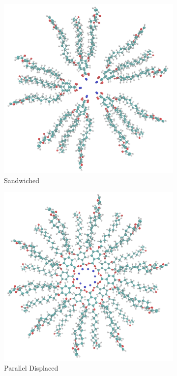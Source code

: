 \documentclass{article}
\begin{document}
\begin{figure}[h]
        \begin{subfigure}{0.475\textwidth}
                \centering
                \includegraphics[width=\textwidth]{sandwichedlayers.png}
                \caption{Sandwiched}\label{fig:sandwichedlayers}
        \end{subfigure}
        \begin{subfigure}{0.475\textwidth}
                \centering
                \includegraphics[width=\textwidth]{offsetlayers.png}
                \caption{Parallel Displaced}\label{fig:offsetlayers}
        \end{subfigure}
	\caption{}\label{fig:initial_configs}
\end{figure}
\end{document}
